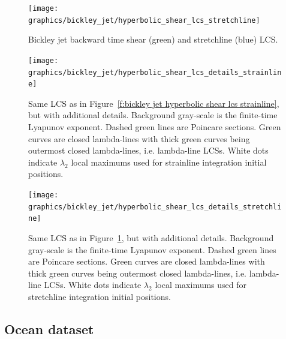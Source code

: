 \documentclass{article}
\begin{document}
\begin{figure}
\begin{center}
\texttt{[image: graphics/bickley\_jet/hyperbolic\_shear\_lcs\_stretchline]}
\end{center}
\caption{Bickley jet backward time shear (green) and stretchline (blue) LCS.}
\label{f:bickley jet hyperbolic shear lcs stretchline}
\end{figure}

\begin{figure}
\begin{center}
\texttt{[image: graphics/bickley\_jet/hyperbolic\_shear\_lcs\_details\_strainline]}
\end{center}
\caption{Same LCS as in Figure~\ref{f:bickley jet hyperbolic shear lcs strainline}, but with additional details. Background gray-scale is the finite-time Lyapunov exponent. Dashed green lines are Poincare sections. Green curves are closed lambda-lines with thick green curves being outermost closed lambda-lines, i.e. lambda-line LCSs. White dots indicate $\lambda_2$ local maximums used for strainline integration initial positions.}
\label{f:bickley jet hyperbolic shear lcs details strainline}
\end{figure}

\begin{figure}
\begin{center}
\texttt{[image: graphics/bickley\_jet/hyperbolic\_shear\_lcs\_details\_stretchline]}
\end{center}
\caption{Same LCS as in Figure~\ref{f:bickley jet hyperbolic shear lcs stretchline}, but with additional details. Background gray-scale is the finite-time Lyapunov exponent. Dashed green lines are Poincare sections. Green curves are closed lambda-lines with thick green curves being outermost closed lambda-lines, i.e. lambda-line LCSs. White dots indicate $\lambda_2$ local maximums used for stretchline integration initial positions.}
\label{f:bickley jet hyperbolic shear lcs details stretchline}
\end{figure}

\subsection{Ocean dataset}
\end{document}
